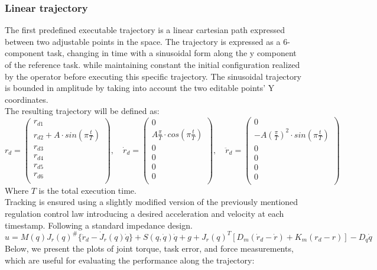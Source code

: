 \documentclass{article}
\begin{document}
\subsubsection{Linear trajectory}
The first predefined executable trajectory is a linear cartesian path expressed between two adjustable points in the space.
The trajectory is expressed as a 6-component task, changing in time with a sinusoidal form along the y component of the reference task. while maintaining constant the initial configuration realized by the operator before executing this specific trajectory. The sinusoidal trajectory is bounded in amplitude by taking into account the two editable points’ Y coordinates.\\
The resulting trajectory will be defined as:
$$r_{d}=\begin{pmatrix}
r_{d1}\\
r_{d2}+A\cdot sin(\pi \frac{t}{T})\\
r_{d3}\\
r_{d4}\\
r_{d5}\\
r_{d6}\\
\end{pmatrix},
\quad \dot{r}_{d}=\begin{pmatrix}
0\\
A\frac{\pi}{T}\cdot cos(\pi \frac{t}{T})\\
0\\
0\\
0\\
0\\
\end{pmatrix},
\quad \ddot{r}_{d}=\begin{pmatrix}
0\\
-A(\frac{\pi}{T})^{2}\cdot sin(\pi \frac{t}{T})\\
0\\
0\\
0\\
0\\
\end{pmatrix}
$$
\newline
Where $T$ is the total execution time.
\\
Tracking is ensured using a slightly modified version of the previously mentioned regulation control law introducing a desired acceleration and velocity at each timestamp. Following a standard impedance design.
$$
u=M(q)J_{r}(q)^{\#}\{\ddot{r}_{d}-\dot{J}_{r}(q)\dot{q}\}+S(q,\dot{q})\dot{q}+g+J_{r}(q)^{T}[D_{m}(\dot{r}_{d}-\dot{r})+K_{m}(r_{d}-r)]-D_{q}\dot{q}
$$
Below, we present the plots of joint torque, task error, and force measurements, which are useful for evaluating the performance along the trajectory:
\end{document}
